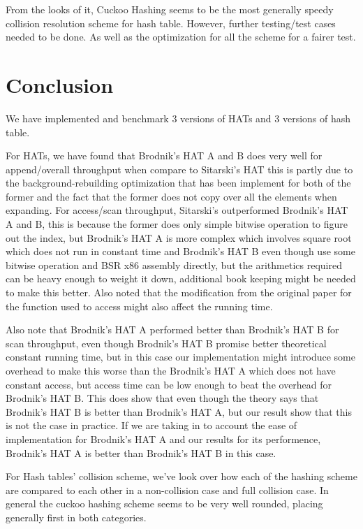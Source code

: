 \documentclass{article} %
\begin{document}
    From the looks of it, Cuckoo Hashing seems to be the most generally speedy collision resolution scheme for hash table.
    However, further testing/test cases needed to be done.
    As well as the optimization for all the scheme for a fairer test.

    \section*{Conclusion}
    We have implemented and benchmark 3 versions of HATs and 3 versions of hash table.

    For HATs, we have found that Brodnik's HAT A and B does very well for append/overall throughput when compare to Sitarski's HAT this is partly due to
    the background-rebuilding optimization that has been implement for both of the former and the fact that the former does not copy over all the elements
    when expanding. For access/scan throughput, Sitarski's outperformed Brodnik's HAT A and B, this is because the former does only simple bitwise operation to figure out the index,
    but Brodnik's HAT A is more complex which involves square root which does not run in constant time and Brodnik's HAT B even though use some bitwise operation and BSR x86 assembly directly, but
    the arithmetics required can be heavy enough to weight it down, additional book keeping might be needed to make this better. Also noted that the modification from
    the original paper for the function used to access might also affect the running time.

    Also note that Brodnik's HAT A performed better than Brodnik's HAT B for scan throughput, even though Brodnik's HAT B promise better theoretical constant running time, but in this
    case our implementation might introduce some overhead to make this worse than the Brodnik's HAT A which does not have constant access, but access time can be low enough to beat the overhead for
    Brodnik's HAT B. This does show that even though the theory says that Brodnik's HAT B is better than Brodnik's HAT A, but our result show that this is not the case in practice.
    If we are taking in to account the ease of implementation for Brodnik's HAT A and our results for its performence, Brodnik's HAT A is better than Brodnik's HAT B in this case.

    For Hash tables' collision scheme, we've look over how each of the hashing scheme are compared to each other in a non-collision case and full collision case.
    In general the cuckoo hashing scheme seems to be very well rounded, placing generally first in both categories.
\end{document}
